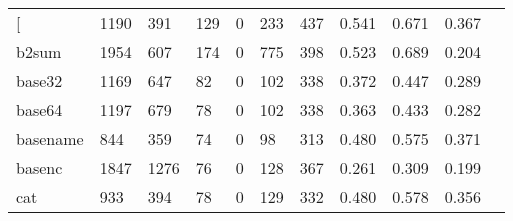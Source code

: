 \begin{longtable}{lp{1.10cm}p{1.10cm}p{1.10cm}p{1.10cm}p{1.10cm}p{1.10cm}p{1.10cm}p{1.10cm}p{1.10cm}p{1.10cm}}
\bottomrule
\endlastfoot
{[}         &                   1190 &                                391 &                               129 &                                0 &                               233 &                             437 &                             0.541 &                                 0.671 &                               0.367 \\
b2sum     &                   1954 &                                607 &                               174 &                                0 &                               775 &                             398 &                             0.523 &                                 0.689 &                               0.204 \\
base32    &                   1169 &                                647 &                                82 &                                0 &                               102 &                             338 &                             0.372 &                                 0.447 &                               0.289 \\
base64    &                   1197 &                                679 &                                78 &                                0 &                               102 &                             338 &                             0.363 &                                 0.433 &                               0.282 \\
basename  &                    844 &                                359 &                                74 &                                0 &                                98 &                             313 &                             0.480 &                                 0.575 &                               0.371 \\
basenc    &                   1847 &                               1276 &                                76 &                                0 &                               128 &                             367 &                             0.261 &                                 0.309 &                               0.199 \\
cat       &                    933 &                                394 &                                78 &                                0 &                               129 &                             332 &                             0.480 &                                 0.578 &                               0.356 \\

\end{longtable}
